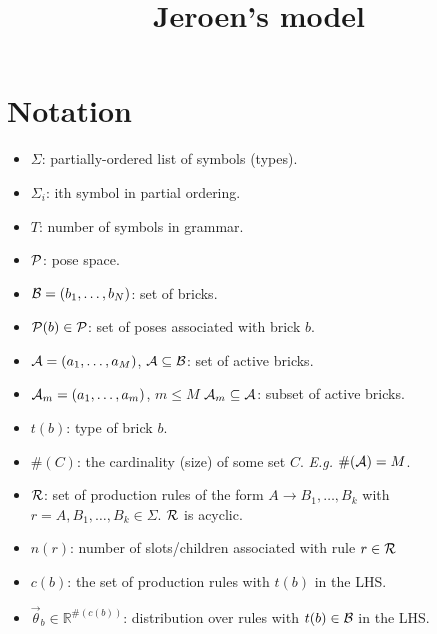 \documentclass[11pt]{article}
\newcommand{\Pose}{{\cal P}}
\newcommand{\A}{{\cal A}}
\newcommand{\symb}{\Sigma}
\newcommand{\B}{\cal B}
\newcommand{\Am}{\A_{m}}
\begin{document}
\title{Jeroen's model}
\maketitle

\section{Notation}

\begin{itemize}

\item $\symb$: partially-ordered list of symbols (types).

\item $\symb_i$: ith symbol in partial ordering.

\item $T$: number of symbols in grammar.

\item $\Pose$: pose space.

\item ${\B} = (b_1,\ldots,b_N)$: set of bricks.

\item $\Pose(b) \in \Pose$: set of poses associated with brick $b$.

\item $\A = (a_1,\ldots,a_M)$, $\A \subseteq {\B}$: set of active bricks.

\item $\Am = (a_1,\ldots,a_m)$, $m \leq M$ $\Am \subseteq {\A}$: subset of active bricks.

\item $t(b)$: type of brick $b$.

\item $\#(C)$: the cardinality (size) of some set $C$. \emph{E.g.} $\#(\A)=M$.

\item ${\cal R}$: set of production rules of the form
$A \rightarrow B_1,\ldots,B_k$ with $r = A,B_1,\ldots,B_k \in \Sigma$. ${\cal R}$ is acyclic.

\item $n(r)$: number of slots/children associated with rule $r \in {\cal R}$

\item $c(b)$: the set of production rules with $t(b)$ in the LHS.

\item $\vec{\theta}_b \in \mathbb{R}^{\#(c(b))}$: distribution over rules with  $t(b) \in \B$ in the LHS.


\end{itemize}
\end{document}
